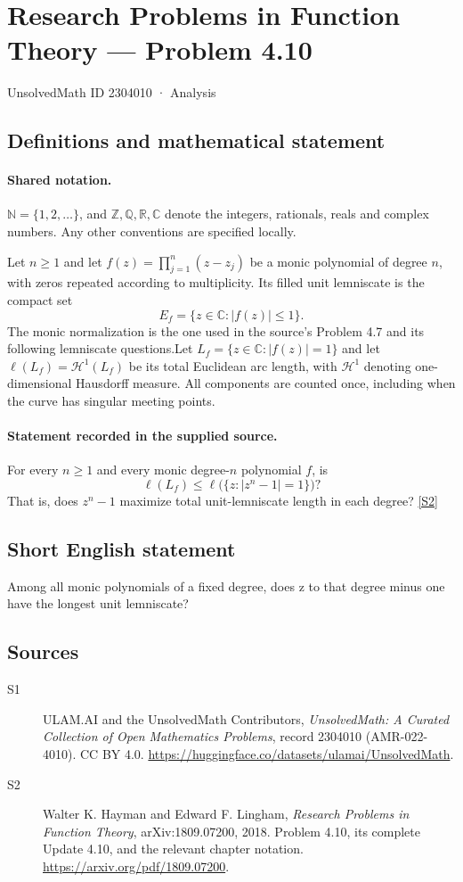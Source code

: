 \documentclass[11pt]{book}
\newcommand{\sref}[2]{\hyperlink{source:#1:#2}{[S#2]}}
\begin{document}
\setcounter{section}{2304009}
\section{Research Problems in Function Theory — Problem 4.10}\label{2304010}
{\small\sffamily UnsolvedMath ID 2304010 · Analysis}
\subsection{Definitions and mathematical statement}

\paragraph{Shared notation.}$\mathbb N=\{1,2,\ldots\}$, and $\mathbb Z,\mathbb Q,\mathbb R,\mathbb C$ denote the integers, rationals, reals and complex numbers. Any other conventions are specified locally.


Let $n\ge1$ and let $f(z)=\prod_{j=1}^n(z-z_j)$ be a monic polynomial of degree $n$, with zeros repeated according to multiplicity. Its filled unit lemniscate is the compact set
\[E_f=\{z\in\mathbb C:|f(z)|\le1\}.
\]
The monic normalization is the one used in the source's Problem 4.7 and its following lemniscate questions.Let $L_f=\{z\in\mathbb C:|f(z)|=1\}$ and let $\ell(L_f)=\mathcal H^1(L_f)$ be its total Euclidean arc length, with $\mathcal H^1$ denoting one-dimensional Hausdorff measure. All components are counted once, including when the curve has singular meeting points.
\paragraph{Statement recorded in the supplied source.}
For every $n\ge1$ and every monic degree-$n$ polynomial $f$, is
\[\ell(L_f)\le\ell\bigl(\{z:|z^n-1|=1\}\bigr)?\]
That is, does $z^n-1$ maximize total unit-lemniscate length in each degree? \sref{2304010}{2}
\subsection{Short English statement}
Among all monic polynomials of a fixed degree, does z to that degree minus one have the longest unit lemniscate?
\subsection{Sources}
\begin{description}
\item[\hypertarget{source:2304010:1}{S1}] ULAM.AI and the UnsolvedMath Contributors, \emph{UnsolvedMath: A Curated Collection of Open Mathematics Problems}, record 2304010 (AMR-022-4010). CC BY 4.0. \url{https://huggingface.co/datasets/ulamai/UnsolvedMath}.
\item[\hypertarget{source:2304010:2}{S2}] Walter K. Hayman and Edward F. Lingham, \emph{Research Problems in Function Theory}, arXiv:1809.07200, 2018. Problem 4.10, its complete Update 4.10, and the relevant chapter notation. \url{https://arxiv.org/pdf/1809.07200}.
\end{description}
\label{end:2304010}
\end{document}
